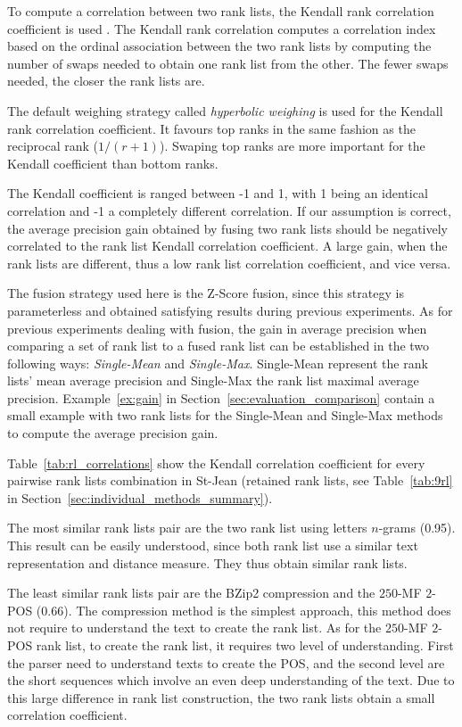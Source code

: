 To compute a correlation between two rank lists, the Kendall rank correlation coefficient is used \cite{scipy}.
The Kendall rank correlation computes a correlation index based on the ordinal association between the two rank lists by computing the number of swaps needed to obtain one rank list from the other.
The fewer swaps needed, the closer the rank lists are.

The default weighing strategy called \textit{hyperbolic weighing} is used for the Kendall rank correlation coefficient.
It favours top ranks in the same fashion as the reciprocal rank ($1 / (r + 1)$).
Swaping top ranks are more important for the Kendall coefficient than bottom ranks.

The Kendall coefficient is ranged between -1 and 1, with 1 being an identical correlation and -1 a completely different correlation.
If our assumption is correct, the average precision gain obtained by fusing two rank lists should be negatively correlated to the rank list Kendall correlation coefficient.
A large gain, when the rank lists are different, thus a low rank list correlation coefficient, and vice versa.

The fusion strategy used here is the Z-Score fusion, since this strategy is parameterless and obtained satisfying results during previous experiments.
As for previous experiments dealing with fusion, the gain in average precision when comparing a set of rank list to a fused rank list can be established in the two following ways: \textit{Single-Mean} and \textit{Single-Max}.
Single-Mean represent the rank lists' mean average precision and Single-Max the rank list maximal average precision.
Example~\ref{ex:gain} in Section~\ref{sec:evaluation_comparison} contain a small example with two rank lists for the Single-Mean and Single-Max methods to compute the average precision gain.

Table~\ref{tab:rl_correlations} show the Kendall correlation coefficient for every pairwise rank lists combination in St-Jean (retained rank lists, see Table~\ref{tab:9rl} in Section~\ref{sec:individual_methods_summary}).

The most similar rank lists pair are the two rank list using letters $n$-grams (0.95).
This result can be easily understood, since both rank list use a similar text representation and distance measure.
They thus obtain similar rank lists.

The least similar rank lists pair are the BZip2 compression and the $250$-MF $2$-POS (0.66).
The compression method is the simplest approach, this method does not require to understand the text to create the rank list.
As for the $250$-MF $2$-POS rank list, to create the rank list, it requires two level of understanding.
First the parser need to understand texts to create the POS, and the second level are the short sequences which involve an even deep understanding of the text.
Due to this large difference in rank list construction, the two rank lists obtain a small correlation coefficient.

